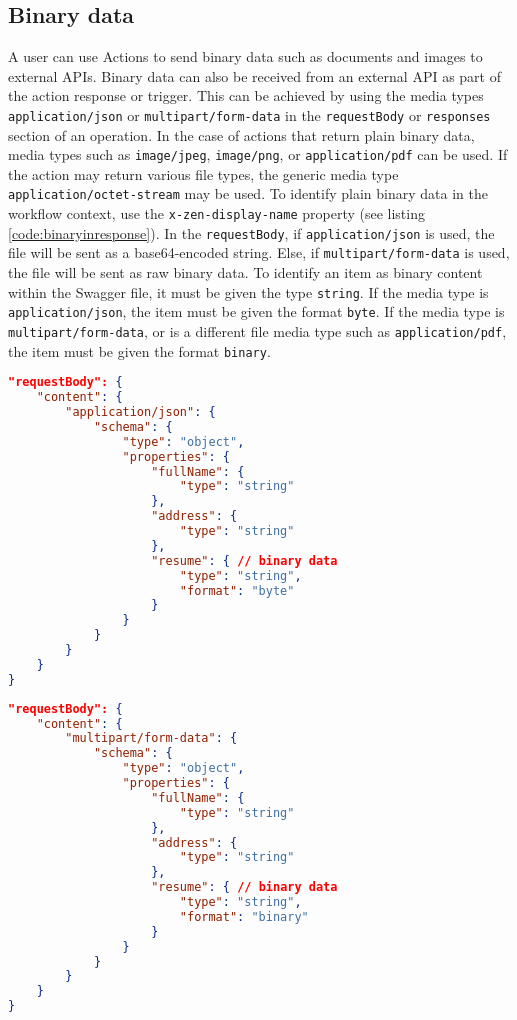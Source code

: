 \subsection{Binary data}
A user can use Actions to send binary data such as documents and images to external APIs. Binary data can also be received from an external API as part of the action response or trigger. This can be achieved by using the media types \texttt{application/json} or \texttt{multipart/form-data} in the \texttt{requestBody} or \texttt{responses} section of an operation. In the case of actions that return plain binary data, media types such as \texttt{image/jpeg}, \texttt{image/png}, or \texttt{application/pdf} can be used. If the action may return various file types, the generic media type \texttt{application/octet-stream} may be used. To identify plain binary data in the workflow context, use the \texttt{x-zen-display-name} property (see listing \ref{code:binaryinresponse}). In the \texttt{requestBody}, if \texttt{application/json} is used, the file will be sent as a base64-encoded string. Else, if \texttt{multipart/form-data} is used, the file will be sent as raw binary data. To identify an item as binary content within the Swagger file, it must be given the type \texttt{string}. If the media type is \texttt{application/json}, the item must be given the format \texttt{byte}. If the media type is \texttt{multipart/form-data}, or is a different file media type such as \texttt{application/pdf}, the item must be given the format \texttt{binary}.\\
\begin{minipage}{\textwidth}
\begin{lstlisting}[caption={Defining files in JSON data},label={code:binaryinjson},language=json]
"requestBody": {
    "content": {
        "application/json": {
            "schema": {
                "type": "object",
                "properties": {
                    "fullName": {
                        "type": "string"
                    },
                    "address": {
                        "type": "string"
                    },
                    "resume": { // binary data
                        "type": "string",
                        "format": "byte"
                    }
                }
            }
        }
    }
}
\end{lstlisting}
\end{minipage}
\begin{minipage}{\textwidth}
\begin{lstlisting}[caption={Defining files in a form post},label={code:binaryinmultipart},language=json]
"requestBody": {
    "content": {
        "multipart/form-data": {
            "schema": {
                "type": "object",
                "properties": {
                    "fullName": {
                        "type": "string"
                    },
                    "address": {
                        "type": "string"
                    },
                    "resume": { // binary data
                        "type": "string",
                        "format": "binary"
                    }
                }
            }
        }
    }
}
\end{lstlisting}
\end{minipage}
